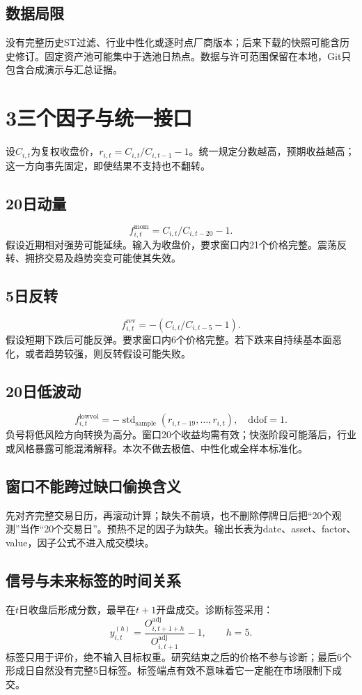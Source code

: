 \documentclass[UTF8,a4paper]{ctexart}
\begin{document}
\subsection*{数据局限}
没有完整历史ST过滤、行业中性化或逐时点厂商版本；后来下载的快照可能含历史修订。固定资产池可能集中于选池日热点。数据与许可范围保留在本地，Git只包含合成演示与汇总证据。

\newpage
\section*{3\quad 三个因子与统一接口}
设$C_{i,t}$为复权收盘价，$r_{i,t}=C_{i,t}/C_{i,t-1}-1$。统一规定分数越高，预期收益越高；这一方向事先固定，即使结果不支持也不翻转。

\subsection*{20日动量}
\[
f^{\mathrm{mom}}_{i,t}=C_{i,t}/C_{i,t-20}-1.
\]
假设近期相对强势可能延续。输入为收盘价，要求窗口内21个价格完整。震荡反转、拥挤交易及趋势突变可能使其失效。

\subsection*{5日反转}
\[
f^{\mathrm{rev}}_{i,t}=-\left(C_{i,t}/C_{i,t-5}-1\right).
\]
假设短期下跌后可能反弹。要求窗口内6个价格完整。若下跌来自持续基本面恶化，或者趋势较强，则反转假设可能失败。

\subsection*{20日低波动}
\[
f^{\mathrm{lowvol}}_{i,t}
=-\operatorname{std}_{\mathrm{sample}}(r_{i,t-19},\ldots,r_{i,t}),
\quad \mathrm{ddof}=1.
\]
负号将低风险方向转换为高分。窗口20个收益均需有效；快涨阶段可能落后，行业或风格暴露可能混淆解释。本次不做去极值、中性化或全样本标准化。

\subsection*{窗口不能跨过缺口偷换含义}
先对齐完整交易日历，再滚动计算；缺失不前填，也不删除停牌日后把“20个观测”当作“20个交易日”。预热不足的因子为缺失。输出长表为date、asset、factor、value，因子公式不进入成交模块。

\subsection*{信号与未来标签的时间关系}
在$t$日收盘后形成分数，最早在$t+1$开盘成交。诊断标签采用：
\[
y^{(h)}_{i,t}=\frac{O^{\mathrm{adj}}_{i,t+1+h}}
                         {O^{\mathrm{adj}}_{i,t+1}}-1,\qquad h=5.
\]
标签只用于评价，绝不输入目标权重。研究结束之后的价格不参与诊断；最后6个形成日自然没有完整5日标签。标签端点有效不意味着它一定能在市场限制下成交。
\end{document}
